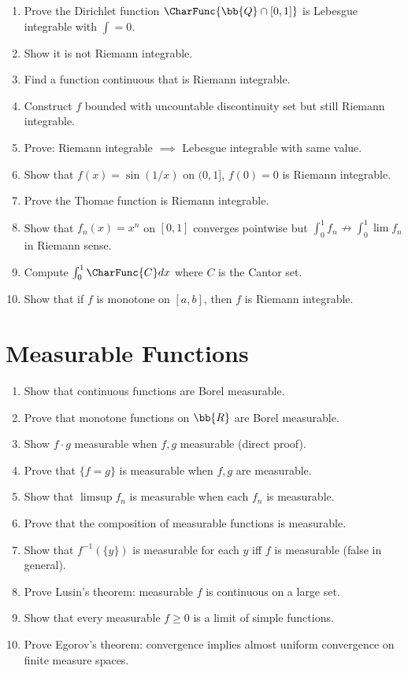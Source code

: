 \begin{enumerate}
    \item Prove the Dirichlet function $\CharFunc{\bb{Q} \cap [0,1]}$ is Lebesgue integrable with $\int = 0$.
    \item Show it is not Riemann integrable.
    \item Find a function continuous \almosteverywhere{} that is Riemann integrable.
    \item Construct $f$ bounded with uncountable discontinuity set but still Riemann integrable.
    \item Prove: Riemann integrable $\implies$ Lebesgue integrable with same value.
    \item Show that $f(x) = \sin(1/x)$ on $(0,1]$, $f(0) = 0$ is Riemann integrable.
    \item Prove the Thomae function is Riemann integrable.
    \item Show that $f_n(x) = x^n$ on $[0,1]$ converges pointwise but $\int_0^1 f_n \not\to \int_0^1 \lim f_n$ in Riemann sense.
    \item Compute $\int_0^1 \CharFunc{C} dx$ where $C$ is the Cantor set.
    \item Show that if $f$ is monotone on $[a,b]$, then $f$ is Riemann integrable.
\end{enumerate}

\section{Measurable Functions}

\begin{enumerate}
    \item Show that continuous functions are Borel measurable.
    \item Prove that monotone functions on $\bb{R}$ are Borel measurable.
    \item Show $f \cdot g$ measurable when $f, g$ measurable (direct proof).
    \item Prove that $\{f = g\}$ is measurable when $f, g$ are measurable.
    \item Show that $\limsup f_n$ is measurable when each $f_n$ is measurable.
    \item Prove that the composition of measurable functions is measurable.
    \item Show that $f^{-1}(\{y\})$ is measurable for each $y$ iff $f$ is measurable (false in general).
    \item Prove Lusin's theorem: measurable $f$ is continuous on a large set.
    \item Show that every measurable $f \geq 0$ is a limit of simple functions.
    \item Prove Egorov's theorem: \almosteverywhere{} convergence implies almost uniform convergence on finite measure spaces.
\end{enumerate}

